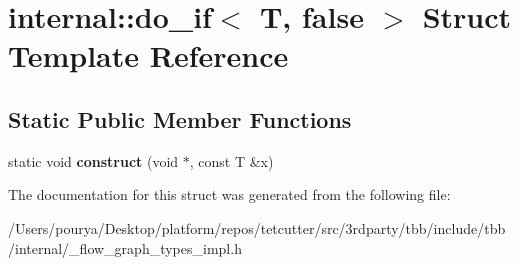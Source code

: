 \hypertarget{structinternal_1_1do__if_3_01T_00_01false_01_4}{}\section{internal\+:\+:do\+\_\+if$<$ T, false $>$ Struct Template Reference}
\label{structinternal_1_1do__if_3_01T_00_01false_01_4}
\subsection*{Static Public Member Functions}
\begin{DoxyCompactItemize}
\item 
\hypertarget{structinternal_1_1do__if_3_01T_00_01false_01_4_ae3a9cf53434109b6201d513c54256e28}{}static void {\bfseries construct} (void $\ast$, const T \&x)\label{structinternal_1_1do__if_3_01T_00_01false_01_4_ae3a9cf53434109b6201d513c54256e28}

\end{DoxyCompactItemize}


The documentation for this struct was generated from the following file\+:\begin{DoxyCompactItemize}
\item 
/\+Users/pourya/\+Desktop/platform/repos/tetcutter/src/3rdparty/tbb/include/tbb/internal/\+\_\+flow\+\_\+graph\+\_\+types\+\_\+impl.\+h\end{DoxyCompactItemize}
